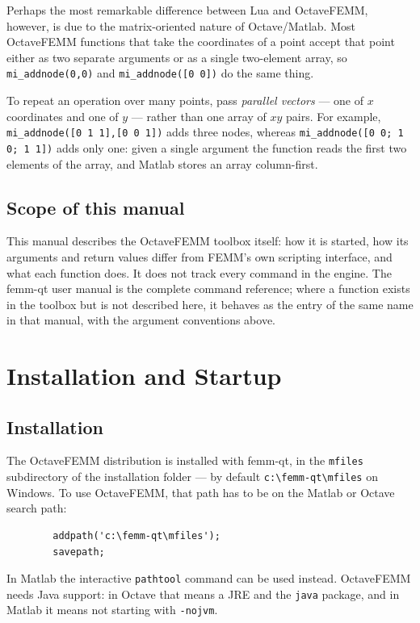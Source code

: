\documentclass[12pt]{article}
\begin{document}
Perhaps the most remarkable difference between Lua and OctaveFEMM,
however, is due to the matrix-oriented nature of Octave/Matlab.  Most
OctaveFEMM functions that take the coordinates of a point accept that point
either as two separate arguments or as a single two-element array, so
{\tt mi\_addnode(0,0)} and {\tt mi\_addnode([0 0])} do the same thing.

To repeat an operation over many points, pass {\em parallel vectors} --- one
of $x$ coordinates and one of $y$ --- rather than one array of $xy$ pairs.
For example, {\tt mi\_addnode([0 1 1],[0 0 1])} adds three nodes, whereas
{\tt mi\_addnode([0 0; 1 0; 1 1])} adds only one: given a single argument
the function reads the first two elements of the array, and Matlab stores
an array column-first.

\subsection{Scope of this manual}

This manual describes the OctaveFEMM toolbox itself: how it is started, how
its arguments and return values differ from FEMM's own scripting interface,
and what each function does.  It does not track every command in the engine.
The femm-qt user manual is the complete command reference; where a function
exists in the toolbox but is not described here, it behaves as the entry of
the same name in that manual, with the argument conventions above.

\section{Installation and Startup}

\subsection{Installation}
The OctaveFEMM distribution is installed with femm-qt, in the
\verb+mfiles+ subdirectory of the installation folder --- by default
\verb+c:\femm-qt\mfiles+ on Windows.  To use OctaveFEMM, that path has
to be on the Matlab or Octave search path:

\begin{verbatim}
        addpath('c:\femm-qt\mfiles');
        savepath;
\end{verbatim}

In Matlab the interactive {\tt pathtool} command can be used instead.
OctaveFEMM needs Java support: in Octave that means a JRE and the
{\tt java} package, and in Matlab it means not starting with
{\tt -nojvm}.
\end{document}
